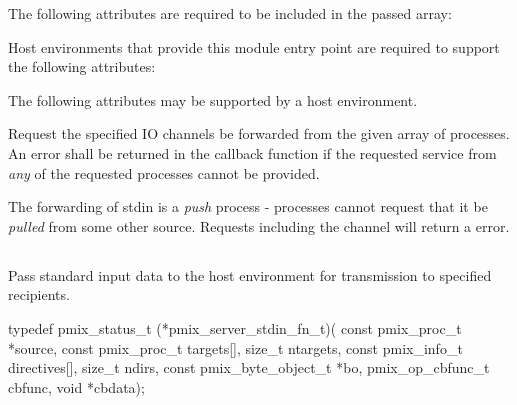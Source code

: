 \reqattrstart
The following attributes are required to be included in the passed  array:


Host environments that provide this module entry point are required to support the following attributes:


\reqattrend

\optattrstart
The following attributes may be supported by a host environment.


\optattrend

\descr

Request the specified IO channels be forwarded from the given array of processes. An error shall be returned in the callback function if the requested service from \textit{any} of the requested processes cannot be provided.

\adviceimplstart
The forwarding of stdin is a \textit{push} process - processes cannot request that it be \textit{pulled} from some other source. Requests including the  channel will return a  error.
\adviceimplend


\subsection{}

\summary

Pass standard input data to the host environment for transmission to specified recipients.

\format

\cspecificstart
\begin{codepar}
typedef pmix_status_t (*pmix_server_stdin_fn_t)(
                           const pmix_proc_t *source,
                           const pmix_proc_t targets[],
                           size_t ntargets,
                           const pmix_info_t directives[],
                           size_t ndirs,
                           const pmix_byte_object_t *bo,
                           pmix_op_cbfunc_t cbfunc, void *cbdata);
\end{codepar}
\cspecificend

